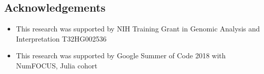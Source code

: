 \documentclass[a0,portrait]{a0poster}
\begin{document}
\begin{multicols}{2}
\section*{Acknowledgements}
\color{Black}
\begin{itemize}
\item This research was supported by NIH Training Grant in Genomic Analysis and Interpretation T32HG002536
\item This research was supported by Google Summer of Code 2018 with NumFOCUS, Julia cohort 
\end{itemize}

\end{multicols}
\end{document}
